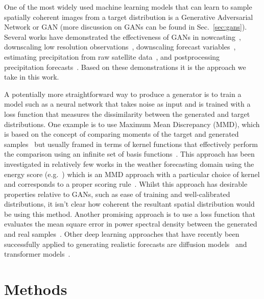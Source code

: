 \documentclass{article}
\begin{document}
One of the most widely used machine learning models that can learn to sample spatially coherent images from a target distribution is a Generative Adversarial Network or GAN (more discussion on GANs can be found in Sec.~\ref{sec:gans}). Several works have demonstrated the effectiveness of GANs in nowcasting~\citep{ravuri_skilful_2021}, downscaling low resolution observations~\citep{leinonen_stochastic_2020}, downscaling forecast variables~\citep{harris_generative_2022, price_increasing_2022}, estimating precipitation from raw satellite data~\citep{hayatbini_conditional_2019}, and postprocessing precipitation forecasts~\citep{duncan_generative_2022, jeong_correcting_2023,  hess_physically_2022, yang_improving_2023}. Based on these demonstrations it is the approach we take in this work. 


A potentially more straightforward way to produce a generator is to train a model such as a neural network that takes noise as input and is trained with a loss function that measures the dissimilarity between the generated and target distributions. One example is to use Maximum Mean Discrepancy (MMD), which is based on the concept of comparing moments of the target and generated samples~\citep{li_generative_2015, dziugaite_training_2015} but usually framed in terms of kernel functions that effectively perform the comparison using an infinite set of basis functions~\citep{murphy_probabilistic_2022}. This approach has been investigated in relatively few works in the weather forecasting domain using the energy score (e.g.~\cite{pacchiardi_probabilistic_2021}) which is an MMD approach with a particular choice of kernel and corresponds to a proper scoring rule~\citep{gneiting_strictly_2007}. Whilst this approach has desirable properties relative to GANs, such as ease of training and well-calibrated distributions, it isn't clear how coherent the resultant spatial distribution would be using this method. Another promising approach is to use a loss function that evaluates the mean square error in power spectral density between the generated and real samples~\citep{singh_numerical_2019}. Other deep learning approaches that have recently been successfully applied to generating realistic forecasts are diffusion models~\citep{li_seeds_2023, addison_machine_2022, leinonen_latent_2023} and transformer models~\citep{ben-bouallegue_improving_2023}.



\section{Methods}
\end{document}
